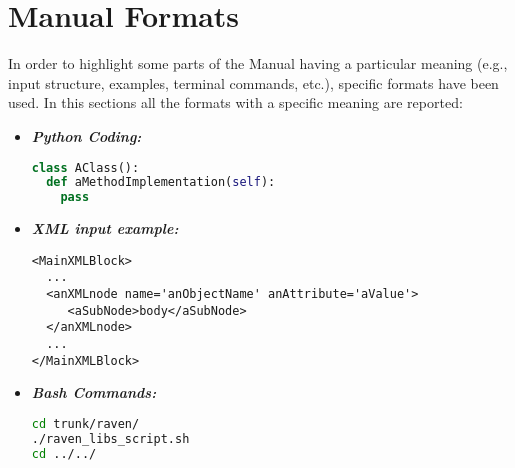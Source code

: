 \section{Manual Formats}
In order to highlight some parts of the Manual having a particular meaning (e.g., input structure, examples, terminal commands, etc.), specific formats have been used. In this sections all the formats with a specific meaning are reported:
\begin{itemize}
\item \textbf{\textit{Python Coding:}}
\begin{lstlisting}[language=python]
class AClass():
  def aMethodImplementation(self):
    pass
\end{lstlisting}
\item \textbf{\textit{XML input example:}}
\begin{lstlisting}[style=XML,morekeywords={anAttribute}]
<MainXMLBlock>
  ...
  <anXMLnode name='anObjectName' anAttribute='aValue'>
     <aSubNode>body</aSubNode>
  </anXMLnode>
  ...
</MainXMLBlock>
\end{lstlisting}
\item \textbf{\textit{Bash Commands:}}
\begin{lstlisting}[language=bash]
cd trunk/raven/
./raven_libs_script.sh
cd ../../
\end{lstlisting}
\end{itemize}


